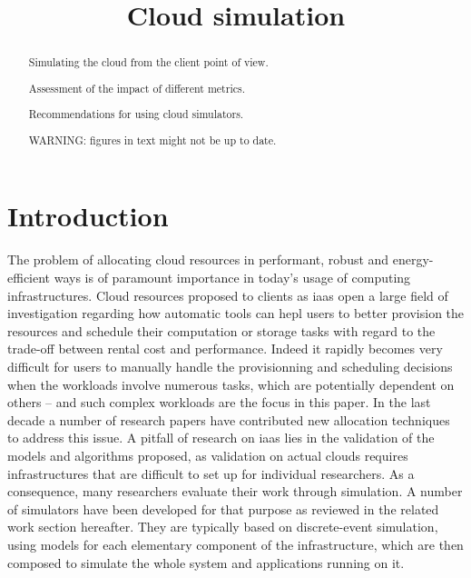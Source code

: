 \documentclass[a4paper,10pt]{article}
\title{Cloud simulation}
\author{}
\begin{document}
\maketitle

\begin{abstract}

Simulating the cloud from the client point of view.

Assessment of the impact of different metrics.

Recommendations for using cloud simulators.

WARNING: figures in text might not be up to date.

\end{abstract}

\section{Introduction}

The  problem   of  allocating   cloud  resources   in  performant,   robust  and
energy-efficient ways is  of paramount importance in today's  usage of computing
infrastructures. Cloud resources  proposed to clients as \ac{iaas}  open a large
field of  investigation regarding how automatic  tools can hepl users  to better
provision the  resources and  schedule their computation  or storage  tasks with
regard to the trade-off between rental  cost and performance.  Indeed it rapidly
becomes  very difficult  for  users  to manually  handle  the provisionning  and
scheduling  decisions  when the  workloads  involve  numerous tasks,  which  are
potentially dependent on  others -- and such complex workloads  are the focus in
this paper. In the last decade a  number of research papers have contributed new
allocation techniques to address this issue.  A pitfall of research on \ac{iaas}
lies in the  validation of the models and algorithms  proposed, as validation on
actual  clouds  requires  infrastructures  that  are difficult  to  set  up  for
individual researchers.  As a consequence,  many researchers evaluate their work
through simulation. A number of simulators  have been developed for that purpose
as reviewed in the related work  section hereafter.  They are typically based on
discrete-event simulation,  using models  for each  elementary component  of the
infrastructure,  which  are then  composed  to  simulate  the whole  system  and
applications running on it.

\end{document}
